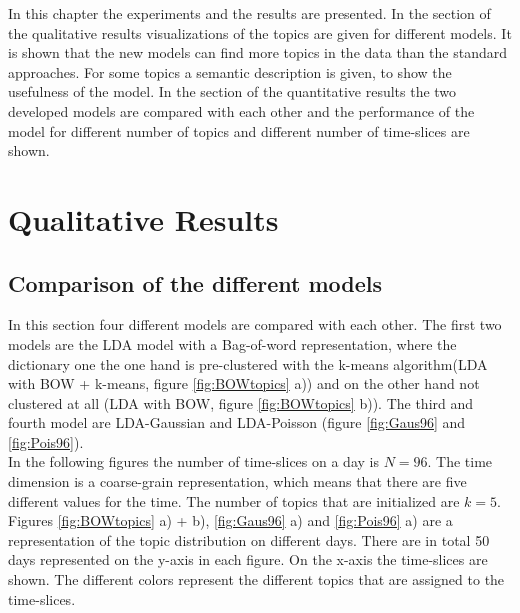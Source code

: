 In this chapter the experiments and the results are presented. In the section of the qualitative results visualizations of the topics are given for different models. It is shown that the new models can find more topics in the data than the standard approaches. For some topics a semantic description is given, to show the usefulness of the model.
In the section of the quantitative results the two developed models are compared with each other and the performance of the model for different number of topics and different number of time-slices are shown.

\section{Qualitative Results}
\subsection{Comparison of the different models}
In this section four different models are compared with each other. The first two models are the LDA model with a Bag-of-word representation, where the dictionary one the one hand is pre-clustered with the k-means algorithm(LDA with BOW + k-means, figure \ref{fig:BOWtopics} a)) and on the other hand not clustered at all (LDA with BOW, figure \ref{fig:BOWtopics} b)). The third and fourth model are LDA-Gaussian and LDA-Poisson (figure \ref{fig:Gaus96} and \ref{fig:Pois96}).\\

In the following figures the number of time-slices on a day is $N=96$. The time dimension is a coarse-grain representation, which means that there are five different values for the time. The number of topics that are initialized are $k=5$. Figures \ref{fig:BOWtopics} a) + b), \ref{fig:Gaus96} a) and \ref{fig:Pois96} a) are a representation of the topic distribution on different days. There are in total 50 days represented on the y-axis in each figure. On the x-axis the time-slices are shown. The different colors represent the different topics that are assigned to the time-slices.\\

